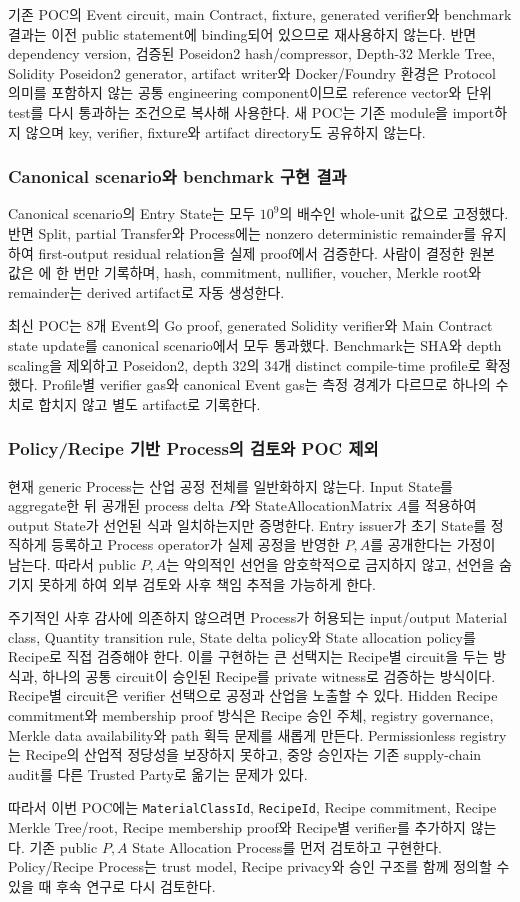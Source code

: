 \documentclass[11pt]{extarticle}
\begin{document}
기존 POC의 Event circuit, main Contract, fixture, generated verifier와 benchmark 결과는
이전 public statement에 binding되어 있으므로 재사용하지 않는다. 반면 dependency version,
검증된 Poseidon2 hash/compressor, Depth-32 Merkle Tree, Solidity Poseidon2 generator,
artifact writer와 Docker/Foundry 환경은 Protocol 의미를 포함하지 않는 공통 engineering
component이므로 reference vector와 단위 test를 다시 통과하는 조건으로 복사해 사용한다.
새 POC는 기존 module을 import하지 않으며 key, verifier, fixture와 artifact directory도
공유하지 않는다.

\subsubsection{Canonical scenario와 benchmark 구현 결과}

Canonical scenario의 Entry State는 모두 $10^9$의 배수인 whole-unit 값으로 고정했다.
반면 Split, partial Transfer와 Process에는 nonzero deterministic remainder를 유지하여
first-output residual relation을 실제 proof에서 검증한다. 사람이 결정한 원본 값은
에 한 번만 기록하며, hash, commitment,
nullifier, voucher, Merkle root와 remainder는 derived artifact로 자동 생성한다.

최신 POC는 8개 Event의 Go proof, generated Solidity verifier와 Main Contract state update를
canonical scenario에서 모두 통과했다. Benchmark는 SHA와 depth scaling을 제외하고
Poseidon2, depth 32의 34개 distinct compile-time profile로 확정했다. Profile별 verifier
gas와 canonical Event gas는 측정 경계가 다르므로 하나의 수치로 합치지 않고 별도 artifact로
기록한다.

\subsubsection{Policy/Recipe 기반 Process의 검토와 POC 제외}

현재 generic Process는 산업 공정 전체를 일반화하지 않는다. Input State를 aggregate한
뒤 공개된 process delta $P$와 StateAllocationMatrix $A$를 적용하여 output State가
선언된 식과 일치하는지만 증명한다. Entry issuer가 초기 State를 정직하게 등록하고
Process operator가 실제 공정을 반영한 $P,A$를 공개한다는 가정이 남는다. 따라서 public
$P,A$는 악의적인 선언을 암호학적으로 금지하지 않고, 선언을 숨기지 못하게 하여 외부
검토와 사후 책임 추적을 가능하게 한다.

주기적인 사후 감사에 의존하지 않으려면 Process가 허용되는 input/output Material class,
Quantity transition rule, State delta policy와 State allocation policy를 Recipe로 직접
검증해야 한다. 이를 구현하는 큰 선택지는 Recipe별 circuit을 두는 방식과, 하나의 공통
circuit이 승인된 Recipe를 private witness로 검증하는 방식이다. Recipe별 circuit은
verifier 선택으로 공정과 산업을 노출할 수 있다. Hidden Recipe commitment와 membership
proof 방식은 Recipe 승인 주체, registry governance, Merkle data availability와 path
획득 문제를 새롭게 만든다. Permissionless registry는 Recipe의 산업적 정당성을 보장하지
못하고, 중앙 승인자는 기존 supply-chain audit를 다른 Trusted Party로 옮기는 문제가 있다.

따라서 이번 POC에는 \texttt{MaterialClassId}, \texttt{RecipeId}, Recipe commitment,
Recipe Merkle Tree/root, Recipe membership proof와 Recipe별 verifier를 추가하지 않는다.
기존 public $P,A$ State Allocation Process를 먼저 검토하고 구현한다. Policy/Recipe
Process는 trust model, Recipe privacy와 승인 구조를 함께 정의할 수 있을 때 후속
연구로 다시 검토한다.
\end{document}
